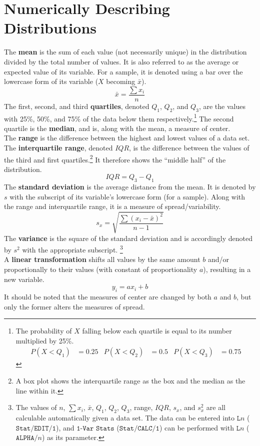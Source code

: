 \documentclass[../AP_Statistics.tex]{subfiles}
\begin{document}
		\section{Numerically Describing Distributions}
			The \textbf{mean} is the sum of each value (not necessarily unique) in the distribution divided by the total number of values. It is also referred to as the average or expected value of its variable. For a sample, it is denoted using a bar over the lowercase form of its variable ($X$ becoming $\bar{x}$).
			$$\bar{x} = \frac{\sum x_i}{n}$$
			The first, second, and third \textbf{quartiles}, denoted $Q_1$, $Q_2$, and $Q_3$, are the values with 25\%, 50\%, and 75\% of the data below them respectively.\footnote{The probability of $X$ falling below each quartile is equal to its number multiplied by 25\%. \begin{align*} P(X < Q_1) &= 0.25 & P(X < Q_2) &= 0.5 & P(X < Q_3) &= 0.75\end{align*}} The second quartile is the \textbf{median}, and is, along with the mean, a measure of center. \\
			The \textbf{range} is the difference between the highest and lowest values of a data set. \\
			The \textbf{interquartile range}, denoted $IQR$, is the difference between the values of the third and first quartiles.\footnote{A box plot shows the interquartile range as the box and the median as the line within it.} It therefore shows the \enquote{middle half} of the distribution.
			$$IQR = Q_3 - Q_1$$
			The \textbf{standard deviation} is the average distance from the mean. It is denoted by $s$  with the subscript of its variable's lowercase form (for a sample). Along with the range and interquartile range, it is a measure of spread/variability.
			$$s_x = \sqrt{\frac{\sum (x_i - \bar{x})^2}{n - 1}}$$
			The \textbf{variance} is the square of the standard deviation and is accordingly denoted by $s^2$ with the appropriate subscript. \footnote{The values of $n$, $\sum x_i$, $\bar{x}$, $Q_1$, $Q_2$, $Q_3$,  range, $IQR$, $s_x$, and $s_x^2$ are all calculable automatically given a data set. The data can be entered into $\texttt{L}n$ ($\texttt{Stat/EDIT/1}$), and $\texttt{1-Var Stats}$ ($\texttt{Stat/CALC/1}$) can be performed with $\texttt{L}n$ ($\texttt{ALPHA/}n$) as its parameter.} \\
			A \textbf{linear transformation} shifts all values by the same amount $b$ and/or proportionally to their values (with constant of proportionality $a$), resulting in a new variable. 
			$$y_i = ax_i + b$$
			It should be noted that the measures of center are changed by both $a$ and $b$, but only the former alters the measures of spread.
\end{document}
